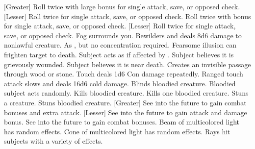 [Greater]
    {Roll twice with large bonus for single attack, save, or opposed check.}
[Lesser]
    {Roll twice for single attack, save, or opposed check.}
    {Roll twice with bonus for single attack, save, or opposed check.}
    {[Lesser] Roll twice for single attack, save, or opposed check.}
    {Fog surrounds you.}
    {Bewilders and deals 8d6 damage to nonlawful creature.}
    {As , but no concentration required.}
    {Fearsome illusion can frighten target to death.}
    {Subject acts as if affected by .}
    {Subject believes it is grievously wounded.}
    {Subject believes it is near death.}
    {Creates an invisible passage through wood or stone.}
    {Touch deals 1d6 Con damage repeatedly.}
    {Ranged touch attack slows and deals 16d6 cold damage.}
    {Blinds bloodied creature.}
    {Bloodied subject acts randomly.}
    {Kills bloodied creature.}
    {Kills one bloodied creature.}
    {Stuns a creature.}
    {Stuns bloodied creature.}
[Greater]
    {See into the future to gain combat bonuses and extra attack.}
[Lesser]
    {See into the future to gain attack and damage bonus.}
    {See into the future to gain combat bonuses.}
    {Beam of multicolored light has random effects.}
    {Cone of multicolored light has random effects.}
    {Rays hit subjects with a variety of effects.}
